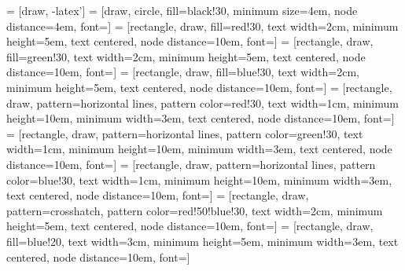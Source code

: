  = [draw, -latex']
 = [draw, circle, fill=black!30, minimum size=4em, node distance=4em, font=\fontsize{30}{10}\selectfont]
 = [rectangle, draw, fill=red!30, text width=2cm, minimum height=5em, text centered, node distance=10em, font=\fontsize{20}{10}\selectfont]
 = [rectangle, draw, fill=green!30, text width=2cm, minimum height=5em, text centered, node distance=10em, font=\fontsize{20}{10}\selectfont]
 = [rectangle, draw, fill=blue!30, text width=2cm, minimum height=5em, text centered, node distance=10em, font=\fontsize{20}{10}\selectfont]
 = [rectangle, draw,  pattern=horizontal lines, pattern color=red!30, text width=1cm, minimum height=10em, minimum width=3em, text centered, node distance=10em, font=\fontsize{25}{10}\selectfont]
 = [rectangle, draw,  pattern=horizontal lines, pattern color=green!30, text width=1cm, minimum height=10em, minimum width=3em, text centered, node distance=10em, font=\fontsize{20}{10}\selectfont]
 = [rectangle, draw,  pattern=horizontal lines, pattern color=blue!30, text width=1cm, minimum height=10em, minimum width=3em, text centered, node distance=10em, font=\fontsize{20}{10}\selectfont]
 = [rectangle, draw,  pattern=crosshatch, pattern color=red!50!blue!30, text width=2cm, minimum height=5em, text centered, node distance=10em, font=\fontsize{20}{10}\selectfont]
 = [rectangle, draw,  fill=blue!20, text width=3cm, minimum height=5em, minimum width=3em, text centered, node distance=10em, font=\fontsize{20}{10}\selectfont]